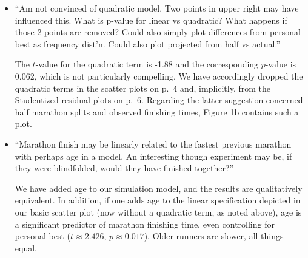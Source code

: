 \documentclass[12pt]{article}
\begin{document}
\begin{itemize}
\item ``Am not convinced of quadratic model. Two points in upper right
  may have influenced this. What is p-value for linear vs quadratic?
  What happens if those 2 points are removed? Could also simply plot
  differences from personal best as frequency dist'n. Could also plot
  projected from half vs actual.''

  The $t$-value for the quadratic term is -1.88 and the corresponding
  $p$-value is 0.062, which is not particularly compelling.  We have
  accordingly dropped the quadratic terms in the scatter plots on p.\
  4 and, implicitly, from the Studentized residual plots on p.\ 6.
  Regarding the latter suggestion concerned half marathon splits and
  observed finishing times, Figure 1b contains such a plot.
  
  
  
  
  
  
\item ``Marathon finish may be linearly related to the fastest
  previous marathon with perhaps age in a model. An interesting though
  experiment may be, if they were blindfolded, would they have
  finished together?''

  We have added age to our simulation model, and the results are
  qualitatively equivalent.  In addition, if one adds age to the
  linear specification depicted in our basic scatter plot (now without
  a quadratic term, as noted above), age is a significant predictor of
  marathon finishing time, even controlling for personal best
  ($t \approx 2.426$, $p \approx 0.017$).  Older runners are slower,
  all things equal.


\end{itemize}
\end{document}
